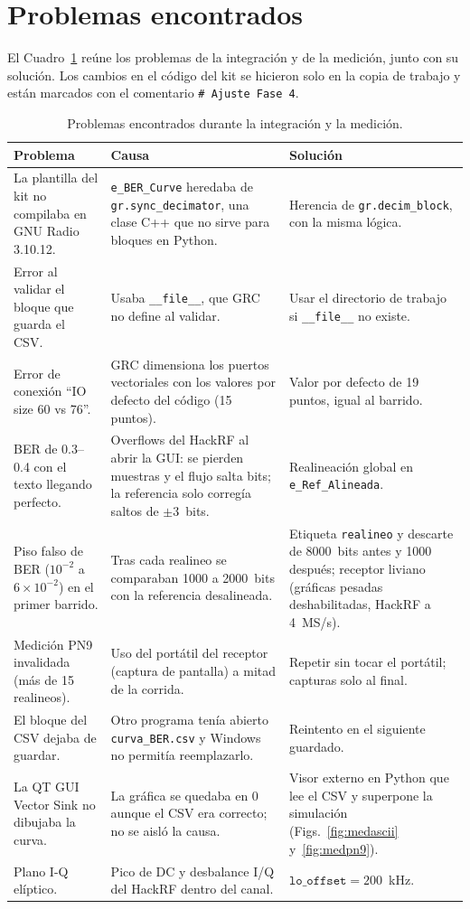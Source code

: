 \documentclass[conference]{IEEEtran}
\begin{document}
\section{Problemas encontrados}

El Cuadro~\ref{tab:err} reúne los problemas de la integración y de la medición, junto con su solución. Los cambios en el código del kit se hicieron solo en la copia de trabajo y están marcados con el comentario \texttt{\# Ajuste Fase 4}.

\begin{table}[!t]
\centering
\caption{Problemas encontrados durante la integración y la medición.}
\label{tab:err}
\begin{tabular}{>{\raggedright}p{4.2cm}>{\raggedright}p{6.2cm}p{6.2cm}}
\toprule
Problema & Causa & Solución \\
\midrule
La plantilla del kit no compilaba en GNU Radio 3.10.12. & \texttt{e\_BER\_Curve} heredaba de \texttt{gr.sync\_decimator}, una clase C++ que no sirve para bloques en Python. & Herencia de \texttt{gr.decim\_block}, con la misma lógica. \\
Error al validar el bloque que guarda el CSV. & Usaba \texttt{\_\_file\_\_}, que GRC no define al validar. & Usar el directorio de trabajo si \texttt{\_\_file\_\_} no existe. \\
Error de conexión ``IO size 60 vs 76''. & GRC dimensiona los puertos vectoriales con los valores por defecto del código (15 puntos). & Valor por defecto de 19 puntos, igual al barrido. \\
BER de 0.3--0.4 con el texto llegando perfecto. & Overflows del HackRF al abrir la GUI: se pierden muestras y el flujo salta bits; la referencia solo corregía saltos de $\pm 3$~bits. & Realineación global en \texttt{e\_Ref\_Alineada}. \\
Piso falso de BER ($10^{-2}$ a $6\times10^{-2}$) en el primer barrido. & Tras cada realineo se comparaban 1000 a 2000~bits con la referencia desalineada. & Etiqueta \texttt{realineo} y descarte de 8000~bits antes y 1000 después; receptor liviano (gráficas pesadas deshabilitadas, HackRF a 4~MS/s). \\
Medición PN9 invalidada (más de 15 realineos). & Uso del portátil del receptor (captura de pantalla) a mitad de la corrida. & Repetir sin tocar el portátil; capturas solo al final. \\
El bloque del CSV dejaba de guardar. & Otro programa tenía abierto \texttt{curva\_BER.csv} y Windows no permitía reemplazarlo. & Reintento en el siguiente guardado. \\
La QT GUI Vector Sink no dibujaba la curva. & La gráfica se quedaba en 0 aunque el CSV era correcto; no se aisló la causa. & Visor externo en Python que lee el CSV y superpone la simulación (Figs.~\ref{fig:medascii} y~\ref{fig:medpn9}). \\
Plano I-Q elíptico. & Pico de DC y desbalance I/Q del HackRF dentro del canal. & $\texttt{lo\_offset} = 200$~kHz. \\
\bottomrule
\end{tabular}
\end{table}
\end{document}
